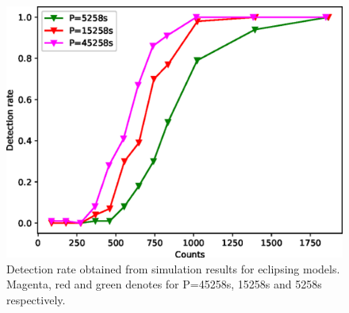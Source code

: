 \documentclass[twoside,twocolumn]{aastex63}
\begin{document}
\begin{figure}[ht!]
\centering
\includegraphics[scale=0.61]{./figure/sim_LW/eclipse_cut.eps}
\caption{Detection rate obtained from simulation results for eclipsing models. Magenta, red and green denotes for P=45258s, 15258s and 5258s respectively. \label{fig:eclipse}}
\end{figure}


\end{document}
